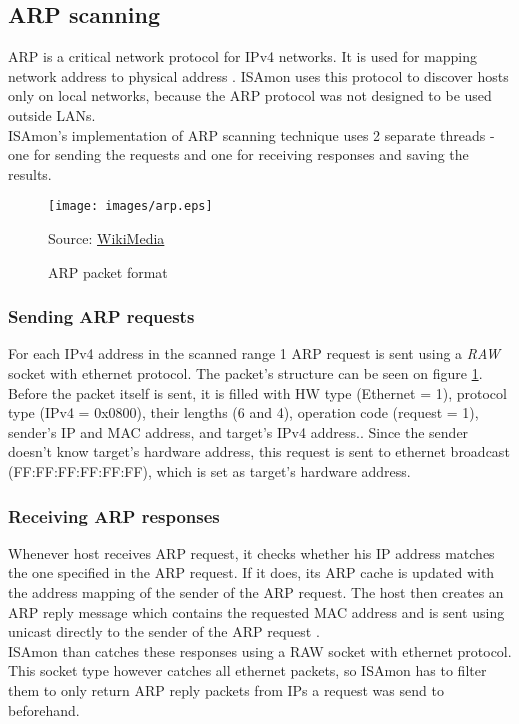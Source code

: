 \documentclass[11pt,a4paper]{article}
\newcommand{\source}[1]{\caption*{Source: {#1}} }
\begin{document}
	\subsection{ARP scanning}
		ARP is a critical network protocol for IPv4 networks. It is used for mapping network address to physical address \cite{RFC0826}\cite{Wiki:ARP}. ISAmon uses this protocol to discover hosts only on local networks, because the ARP protocol was not designed to be used outside LANs.\\
		ISAmon's implementation of ARP scanning technique uses 2 separate threads - one for sending the requests and one for receiving responses and saving the results.\\


		\begin{figure}[h]
			\centering
			\texttt{[image: images/arp.eps]}
			\caption{ARP packet format}
			\label{fig:arp}
			\source{\href{https://commons.wikimedia.org/wiki/Category:Address_Resolution_Protocol}{WikiMedia}}
		\end{figure}

		\subsubsection*{Sending ARP requests}
			For each IPv4 address in the scanned range 1 ARP request is sent using a \emph{RAW} socket with ethernet protocol. The packet's structure can be seen on figure \ref{fig:arp}. Before the packet itself is sent, it is filled with HW type (Ethernet = 1), protocol type (IPv4 = 0x0800), their lengths (6 and 4), operation code (request = 1), sender's IP and MAC address, and target's IPv4 address.\cite{Wiki:ARP}. Since the sender doesn't know target's hardware address, this request is sent to ethernet broadcast (FF:FF:FF:FF:FF:FF), which is set as target's hardware address.


		\subsubsection*{Receiving ARP responses}\label{section:arp_receiving}
			Whenever host receives ARP request, it checks whether his IP address matches the one specified in the ARP request. If it does, its ARP cache is updated with the address mapping of the sender of the ARP request. The host then creates an ARP reply message which contains the requested MAC address and is sent using unicast directly to the sender of the ARP request \cite{microsoft:arp_process}.\\
			ISAmon than catches these responses using a RAW socket with ethernet protocol. This socket type however catches all ethernet packets, so ISAmon has to filter them to only return ARP reply packets from IPs a request was send to beforehand.
\end{document}
